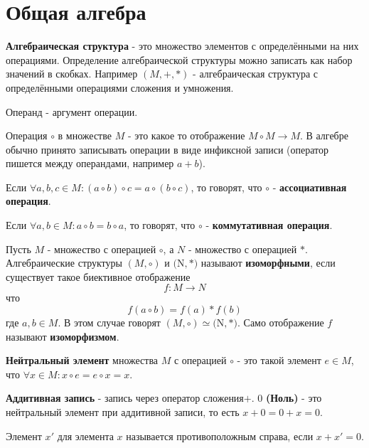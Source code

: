 \chapter{Общая алгебра}
\textbf{Алгебраическая структура} - это множество элементов с определёнными на них операциями. Определение алгебраической структуры можно записать как набор значений в скобках.
Например $(M, +, *)$ - алгебраическая структура с определёнными операциями сложения и умножения.


Операнд - аргумент операции.

Операция $\circ$ в множестве $M$ - это какое то отображение $M \circ M  \rightarrow M$. В алгебре обычно принято записывать операции в виде инфиксной записи (оператор пишется между операндами, например $a + b$).

Если $\forall a,b,c \in M : (a \circ b) \circ c = a \circ (b \circ c)$, то говорят, что $\circ$ -  \textbf{ассоциативная операция}.

Если $\forall a,b \in M : a \circ b = b \circ a$, то говорят, что $\circ$ - \textbf{коммутативная операция}.

Пусть $M$ - множество с операцией $\circ$, а $N$ - множество с операцией $*$. Алгебраические структуры $(M, \circ)$ и $($N$, *)$ называют \textbf{изоморфными}, если существует такое биективное отображение
$$
f: M \rightarrow N
$$
что
$$
f(a \circ b) = f(a) * f(b)
$$
где $a, b \in M$. В этом случае говорят $(M, \circ) \simeq ($N$, *)$. Само отображение $f$ называют  \textbf{изоморфизмом}.

\textbf{Нейтральный элемент} множества $M$  с операцией $\circ$ - это такой элемент $e \in M$, что $\forall x \in M : x \circ e = e \circ x = x$.


\textbf{Аддитивная запись} - запись через оператор сложения$\mathbf{+}$. $0$ \textbf{(Ноль)} - это нейтральный элемент при аддитивной записи, то есть $x + 0 = 0 + x = 0$. 

Элемент $x'$ для элемента $x$ называется противоположным справа, если $x + x' = 0$.

